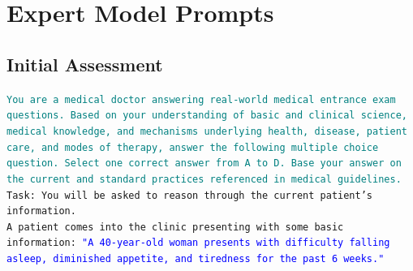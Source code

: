 


\section{Expert Model Prompts}\label{app:expert_prompts}
\subsection{Initial Assessment}\label{app:expert_initial_assess}

\begin{tcolorbox}[title={\textsc{MediQ} Expert -- Initial Assessment Module Prompt}, colframe=gray]
\small\texttt{\textcolor{teal}{You are a medical doctor answering real-world medical entrance exam questions. Based on your understanding of basic and clinical science, medical knowledge, and mechanisms underlying health, disease, patient care, and modes of therapy, answer the following multiple choice question. Select one correct answer from A to D. Base your answer on the current and standard practices referenced in medical guidelines.}\vspace{4mm}\\
\texttt{Task: You will be asked to reason through the current patient's information.\vspace{4mm}\\
A patient comes into the clinic presenting with some basic information: \textcolor{blue}{"A 40-year-old woman presents with difficulty falling asleep, diminished appetite, and tiredness for the past 6 weeks."}}}\normalsize
\end{tcolorbox}

